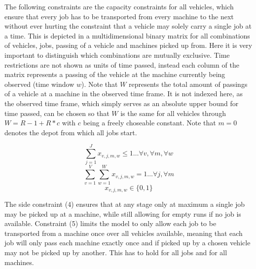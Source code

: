 The following constraints are the capacity constraints for all vehicles, which ensure that every job has to be transported from every machine to the
next without ever hurting the constraint that a vehicle may solely carry a single job at a time. This is depicted in a multidimensional binary matrix
for all combinations of vehicles, jobs, passing of a vehicle and machines picked up from. Here it is very important to distinguish which combinations are mutually exclusive.
Time restrictions are not shown as units of time passed, instead each column of the matrix represents a passing of the vehicle at the machine currently
being observed (time window \(w\)). Note that \(W\) represents the total amount of passings of a vehicle at a machine in the observed time frame. It
is not indexed here, as the observed time frame, which simply serves as an absolute upper bound for time passed, can be chosen so that \(W\) is the same
for all vehicles through \(W = R - 1 + R * c\) with \(c\) being a freely choseable constant. Note that \(m = 0\) denotes the depot from which all jobs
start.

\begin{equation}
 \sum_{j=1}^{J}x_{v,j,m,w} \leq 1 \ldots \forall v, \forall m, \forall w 
\end{equation}
\begin{equation}
 \sum_{v=1}^{V}\sum_{w=1}^{W}x_{v,j,m,w} = 1 \ldots \forall j, \forall m
\end{equation}
\begin{equation}
 x_{v,j,m,w} \in \{0,1\}
\end{equation}

The side constraint (4) ensures that at any stage only at maximum a single job may be picked up at a machine, while still allowing for empty runs if no job
is available. Constraint (5) limits the model to only allow each job to be transported from a machine once over all vehicles available, meaning that
each job will only pass each machine exactly once and if picked up by a chosen vehicle may not be picked up by another. This has to hold for all jobs
and for all machines.

